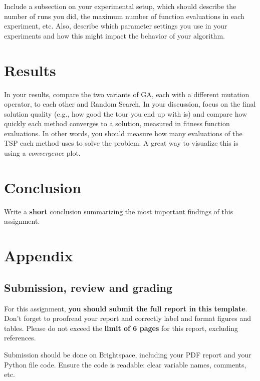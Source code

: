 \documentclass[runningheads]{llncs}
\begin{document}
Include a subsection on your experimental setup, which should describe the number of runs you did, the maximum number of function evaluations in each experiment, etc. Also, describe which parameter settings you use in your experiments and how this might impact the behavior of your algorithm. 

\section{Results}
In your results, compare the two variants of GA, each with a different mutation operator, to each other and Random Search. In your discussion, focus on the final solution quality (e.g., how good the tour you end up with is) and compare how quickly each method converges to a solution, measured in fitness function evaluations. In other words, you should measure how many evaluations of the TSP each method uses to solve the problem. A great way to visualize this is using a \textit{convergence} plot. 

\section{Conclusion}\label{sec:conclusion}
Write a \textbf{short} conclusion summarizing the most important findings of this assignment. 

\appendix
\section{Appendix}
\subsection{Submission, review and grading}\label{sec:submission}
For this assignment, \textbf{you should submit the full report in this template}. Don’t forget to proofread your report and correctly label and format figures and tables. Please do not exceed the \textbf{limit of 6 pages} for this report, excluding references.

Submission should be done on Brightspace, including your PDF report and your Python file code. Ensure the code is readable: clear variable names, comments, etc. 



\end{document}
